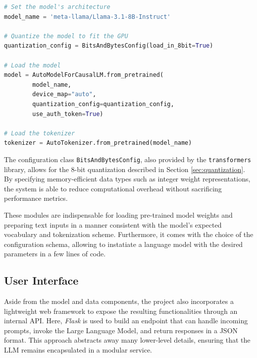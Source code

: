 \begin{center}
\begin{minipage}{0.7\textwidth}
\begin{lstlisting}[language=Python, frame=single, caption=Importing LLaMa through Transformers Library]
# Set the model's architecture
model_name = 'meta-llama/Llama-3.1-8B-Instruct'

# Quantize the model to fit the GPU
quantization_config = BitsAndBytesConfig(load_in_8bit=True)
    
# Load the model
model = AutoModelForCausalLM.from_pretrained(
        model_name,
        device_map="auto",
        quantization_config=quantization_config,
        use_auth_token=True)

# Load the tokenizer
tokenizer = AutoTokenizer.from_pretrained(model_name)
\end{lstlisting}
\label{lst:transformers-script}
\end{minipage}
\end{center}

The configuration class \verb|BitsAndBytesConfig|, also provided by the \verb|transformers| library, allows for the 8-bit quantization described in Section \ref{sec:quantization}. By specifying memory-efficient data types such as integer weight representations, the system is able to reduce computational overhead without sacrificing performance metrics.

These modules are indispensable for loading pre-trained model weights and preparing text inputs in a manner consistent with the model’s expected vocabulary and tokenization scheme. Furthermore, it comes with the choice of the configuration schema, allowing to instatiate a language model with the desired parameters in a few lines of code.


\subsection{User Interface}
\label{sec:user-interface}

Aside from the model and data components, the project also incorporates a lightweight web framework to expose the resulting functionalities through an internal API. Here, \textit{Flask} is used to build an endpoint that can handle incoming prompts, invoke the Large Language Model, and return responses in a JSON format. This approach abstracts away many lower-level details, ensuring that the LLM remains encapsulated in a modular service.

